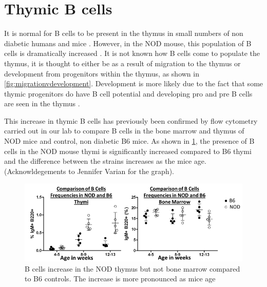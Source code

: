 

\section{Thymic B cells}
\label{sec:thymicBcells}
 
It is normal for B cells to be present in the thymus in small numbers \citep{Isaacson1987, Akashi2000, Miyama1988} of non diabetic humans \citep{Isaacson1987} and mice \citep{Akashi2000}. 
However, in the NOD mouse, this population of B cells is dramatically increased \citep{OReilly1994, Serreze1998}.
It is not known how B cells come to populate the thymus, it is thought to either be as a result of migration to the thymus or development from progenitors within the thymus, as shown in \cref{fig:migrationvdevelopment}.
Development is more likely due to the fact that some thymic progenitors do have B cell potential \citep{Porritt2004} and developing pro and pre B cells are seen in the thymus \citep{Akashi2000}.


This increase in thymic B cells has previously been confirmed by flow cytometry carried out in our lab to compare B cells in the bone marrow and thymus of NOD mice and control, non diabetic B6 mice.
As shown in \cref{fig:JVgraph}, the presence of B cells in the NOD mouse thymi is significantly increased compared to B6 thymi and the difference between the strains increases as the mice age. (Acknowldegements to Jennifer Varian for the graph).

\begin{figure}
\includegraphics[width=\textwidth]{Figures/JVgraph.pdf}
\caption{B cells increase in the NOD thymus but not bone marrow compared to B6 controls.
The increase is more pronounced as mice age}
\label{fig:JVgraph}
\end{figure}

